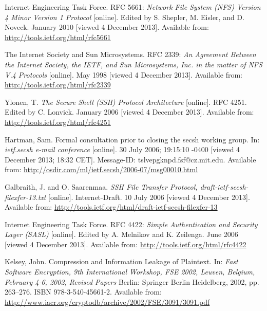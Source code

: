 \begin{thebibliography}{99}
	{\sc Internet Engineering Task Force}.
	RFC 5661:
	\emph{Network File System (NFS) Version 4 Minor Version 1 Protocol}
	[online].
	Edited by S. Shepler, M. Eisler, and D. Noveck.
	January 2010 [viewed 4 December 2013].
	Available from: \url{http://tools.ietf.org/html/rfc5661}

	{\sc The Internet Society} and {\sc Sun Microsystems}.
	RFC 2339:
	\emph{An Agreement Between the Internet Society, the IETF, and Sun Microsystems, Inc. in the matter of NFS V.4 Protocols}
	[online].
	May 1998 [viewed 4 December 2013].
	Available from: \url{http://tools.ietf.org/html/rfc2339}

	{\sc Ylonen,} T.
	\emph{The Secure Shell (SSH) Protocol Architecture}
	[online].
	RFC 4251.
	Edited by C. Lonvick.
	January 2006 [viewed 4 December 2013].
	Available from: \url{http://tools.ietf.org/html/rfc4251}

	{\sc Hartman,} Sam.
	Formal consultation prior to closing the secsh working group.
	In: \emph{ietf.secsh e-mail conference}
	[online].
	30 July 2006; 19:15:10 -0400 [viewed 4 December 2013; 18:32 CET].
	Message-ID: tslvepgknpd.fsf@cz.mit.edu.
	Available from: \newline \url{http://osdir.com/ml/ietf.secsh/2006-07/msg00010.html}

	{\sc Galbraith,} J. and O. {\sc Saarenmaa}.
	\emph{SSH File Transfer Protocol, draft-ietf-secsh-filexfer-13.txt}
	[online].
	Internet-Draft.
	10 July 2006 [viewed 4 December 2013].
	Available from: \newline \url{http://tools.ietf.org/html/draft-ietf-secsh-filexfer-13}


	{\sc Internet Engineering Task Force}.
	RFC 4422:
	\emph{Simple Authentication and Security Layer (SASL)}
	[online].
	Edited by A. Melnikov and K. Zeilenga.
	June 2006 [viewed 4 December 2013].
	Available from: \newline \url{http://tools.ietf.org/html/rfc4422}

	{\sc Kelsey,} John.
	Compression and Information Leakage of Plaintext.
	In: \emph{Fast Software Encryption, 9th International Workshop, FSE 2002,
	Leuven, Belgium, February 4-6, 2002, Revised Papers}
	Berlin: Springer Berlin Heidelberg, 2002, pp. 263--276.
	ISBN 978-3-540-45661-2.
	Available from: \url{http://www.iacr.org/cryptodb/archive/2002/FSE/3091/3091.pdf}


\end{thebibliography}
